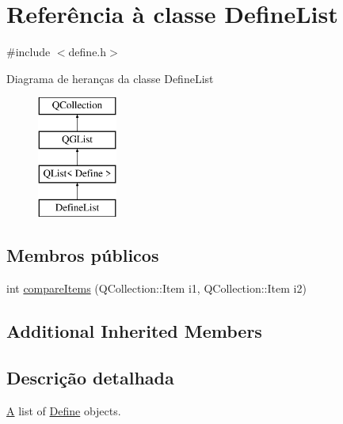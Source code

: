 \hypertarget{class_define_list}{\section{Referência à classe Define\-List}
\label{class_define_list}
}


{\ttfamily \#include $<$define.\-h$>$}

Diagrama de heranças da classe Define\-List\begin{figure}[H]
\begin{center}
\leavevmode
\includegraphics[height=4.000000cm]{class_define_list}
\end{center}
\end{figure}
\subsection*{Membros públicos}
\begin{DoxyCompactItemize}
\item 
int \hyperlink{class_define_list_a44ca4833fab8a8d30ea70614e7d47753}{compare\-Items} (Q\-Collection\-::\-Item i1, Q\-Collection\-::\-Item i2)
\end{DoxyCompactItemize}
\subsection*{Additional Inherited Members}


\subsection{Descrição detalhada}
\hyperlink{class_a}{A} list of \hyperlink{class_define}{Define} objects. 

